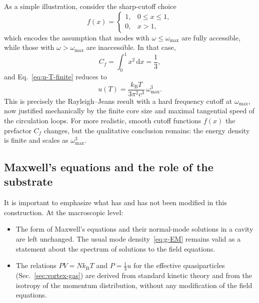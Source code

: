 \documentclass[11pt]{article}
\begin{document}
            As a simple illustration, consider the sharp-cutoff choice
            \begin{equation}
                f(x) =
                \begin{cases}
                    1, & 0 \leq x \leq 1,\\[3pt]
                    0, & x > 1,
                \end{cases}
            \end{equation}
            which encodes the assumption that modes with $\omega \leq \omega_{\max}$ are fully
            accessible, while those with $\omega > \omega_{\max}$ are inaccessible.
            In that case,
            \begin{equation}
                C_f = \int_0^1 x^2\,\mathrm{d}x = \frac{1}{3},
            \end{equation}
            and Eq.~\eqref{eq:u-T-finite} reduces to
            \begin{equation}
                u(T)
                = \frac{k_{\mathrm B}T}{3\pi^2 c^3}\,\omega_{\max}^3.
                \label{eq:u-RJ-cut-1}
            \end{equation}
            This is precisely the Rayleigh--Jeans result with a hard frequency cutoff
            at $\omega_{\max}$, now justified mechanically by the finite core size and maximal
            tangential speed of the circulation loops. For more realistic, smooth cutoff
            functions $f(x)$ the prefactor $C_f$ changes, but the qualitative conclusion
            remains: the energy density is finite and scales as $\omega_{\max}^3$.

        \subsection{Maxwell's equations and the role of the substrate}

            It is important to emphasize what has and has not been modified in this construction.
            At the macroscopic level:

            \begin{itemize}
                \item The form of Maxwell's equations and their normal-mode solutions in a cavity
                are left unchanged. The usual mode density~\eqref{eq:g-EM} remains valid
                as a statement about the spectrum of solutions to the field equations.

                \item The relations $P V = N k_{\mathrm B}T$ and $P = \tfrac{1}{3}u$ for the
                effective quasiparticles (Sec.~\ref{sec:vortex-gas}) are derived from
                standard kinetic theory and from the isotropy of the momentum distribution,
                without any modification of the field equations.
            \end{itemize}
\end{document}
